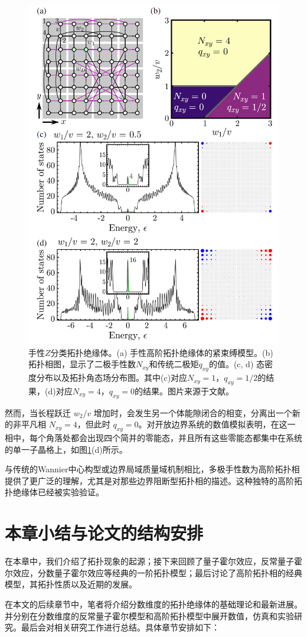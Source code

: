 \begin{figure}
    \centering
    \includegraphics[width=0.5\linewidth]{figure/Introduction/CHOTI.png}
    \caption{手性$Z$分类拓扑绝缘体。(a) 手性高阶拓扑绝缘体的紧束缚模型。(b) 拓扑相图，显示了二极手性数$N_{xy}$和传统二极矩$q_{xy}$的值。(c, d) 态密度分布以及拓扑角态场分布图。其中(c)对应$N_{xy}=1$，$q_{xy}=1/2$的结果，(d)对应$N_{xy}=4$，$q_{xy}=0$的结果。图片来源于文献\cite{benalcazar2022chiral}。}
    \label{fig:CHOTI}
\end{figure}

然而，当长程跃迁 \( w_2/v \) 增加时，会发生另一个体能隙闭合的相变，分离出一个新的非平凡相 \( N_{xy} = 4 \)，但此时 \( q_{xy} = 0 \)。对开放边界系统的数值模拟表明，在这一相中，每个角落处都会出现四个简并的零能态，并且所有这些零能态都集中在系统的单一子晶格上，如图\ref{fig:CHOTI}(d)所示。

与传统的Wannier中心构型或边界局域质量域机制相比，多极手性数为高阶拓扑相提供了更广泛的理解，尤其是对那些边界阻断型拓扑相的描述。这种独特的高阶拓扑绝缘体已经被实验验证\cite{li2023large,wang2023realization}。

\section{本章小结与论文的结构安排}
在本章中，我们介绍了拓扑现象的起源；接下来回顾了量子霍尔效应，反常量子霍尔效应，分数量子霍尔效应等经典的一阶拓扑模型；最后讨论了高阶拓扑相的经典模型，其拓扑性质以及近期的发展。

在本文的后续章节中，笔者将介绍分数维度的拓扑绝缘体的基础理论和最新进展。并分别在分数维度的反常量子霍尔模型和高阶拓扑模型中展开数值，仿真和实验研究。最后会对相关研究工作进行总结。具体章节安排如下：

